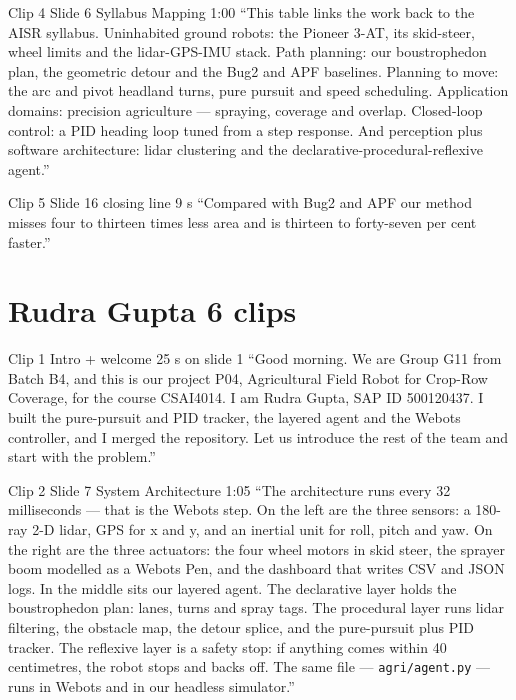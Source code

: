 \documentclass[11pt,a4paper]{article}
\begin{document}
\begin{clipbox}{Clip 4 \textbullet{} Slide 6 Syllabus Mapping \textbullet{} 1:00}
``This table links the work back to the AISR syllabus. Uninhabited ground robots: the Pioneer 3-AT, its skid-steer, wheel limits and the lidar-GPS-IMU stack. Path planning: our boustrophedon plan, the geometric detour and the Bug2 and APF baselines. Planning to move: the arc and pivot headland turns, pure pursuit and speed scheduling. Application domains: precision agriculture --- spraying, coverage and overlap. Closed-loop control: a PID heading loop tuned from a step response. And perception plus software architecture: lidar clustering and the declarative-procedural-reflexive agent.''
\end{clipbox}

\begin{clipbox}{Clip 5 \textbullet{} Slide 16 closing line \textbullet{} 9 s}
``Compared with Bug2 and APF our method misses four to thirteen times less area and is thirteen to forty-seven per cent faster.''
\end{clipbox}

\section*{\color{brand}Rudra Gupta \textbullet{} 6 clips}

\begin{clipbox}{Clip 1 \textbullet{} Intro + welcome \textbullet{} 25 s \textbullet{} on slide 1}
``Good morning. We are Group G11 from Batch B4, and this is our project P04, Agricultural Field Robot for Crop-Row Coverage, for the course CSAI4014. I am Rudra Gupta, SAP ID 500120437. I built the pure-pursuit and PID tracker, the layered agent and the Webots controller, and I merged the repository. Let us introduce the rest of the team and start with the problem.''
\end{clipbox}

\begin{clipbox}{Clip 2 \textbullet{} Slide 7 System Architecture \textbullet{} 1:05}
``The architecture runs every 32 milliseconds --- that is the Webots step. On the left are the three sensors: a 180-ray 2-D lidar, GPS for x and y, and an inertial unit for roll, pitch and yaw. On the right are the three actuators: the four wheel motors in skid steer, the sprayer boom modelled as a Webots Pen, and the dashboard that writes CSV and JSON logs. In the middle sits our layered agent. The declarative layer holds the boustrophedon plan: lanes, turns and spray tags. The procedural layer runs lidar filtering, the obstacle map, the detour splice, and the pure-pursuit plus PID tracker. The reflexive layer is a safety stop: if anything comes within 40 centimetres, the robot stops and backs off. The same file --- \texttt{agri/agent.py} --- runs in Webots and in our headless simulator.''
\end{clipbox}
\end{document}
